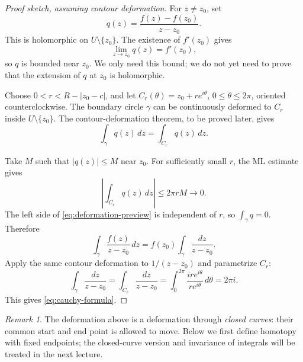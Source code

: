 \documentclass[11pt]{article}
\theoremstyle{plain}
\theoremstyle{definition}
\theoremstyle{remark}
\newtheorem*{remark}{Remark}
\numberwithin{equation}{section}
\begin{document}
\begin{proof}[Proof sketch, assuming contour deformation]
For $z\neq z_0$, set
\[
 q(z)=\frac{f(z)-f(z_0)}{z-z_0}.
\]
This is holomorphic on $U\setminus\{z_0\}$. The existence of $f'(z_0)$
gives
\[
 \lim_{z\to z_0}q(z)=f'(z_0),
\]
so $q$ is bounded near $z_0$. We only need this bound; we do not yet
need to prove that the extension of $q$ at $z_0$ is holomorphic.

Choose $0<r<R-|z_0-c|$, and let
$C_r(\theta)=z_0+re^{i\theta}$, $0\leq\theta\leq2\pi$, oriented
counterclockwise. The boundary circle $\gamma$ can be continuously
 deformed to $C_r$ inside $U\setminus\{z_0\}$. The contour-deformation
 theorem, to be proved later, gives
\begin{equation}\label{eq:deformation-preview}
 \int_\gamma q(z)\,dz=\int_{C_r}q(z)\,dz.
\end{equation}

\begin{center}
\end{center}

Take $M$ such that $|q(z)|\leq M$ near $z_0$. For sufficiently small
$r$, the ML estimate gives
\[
 \left|\int_{C_r}q(z)\,dz\right|\leq2\pi rM\longrightarrow0.
\]
The left side of \eqref{eq:deformation-preview} is independent of $r$,
so $\int_\gamma q=0$. Therefore
\[
 \int_\gamma\frac{f(z)}{z-z_0}\,dz
 =f(z_0)\int_\gamma\frac{dz}{z-z_0}.
\]
Apply the same contour deformation to $1/(z-z_0)$ and parametrize $C_r$:
\[
 \int_\gamma\frac{dz}{z-z_0}
 =\int_{C_r}\frac{dz}{z-z_0}
 =\int_0^{2\pi}\frac{ire^{i\theta}}{re^{i\theta}}\,d\theta
 =2\pi i.
\]
This gives \eqref{eq:cauchy-formula}.
\end{proof}

\begin{remark}
The deformation above is a deformation through \emph{closed curves}:
their common start and end point is allowed to move. Below we first
 define homotopy with fixed endpoints; the closed-curve version and
invariance of integrals will be treated in the next lecture.
\end{remark}
\end{document}

